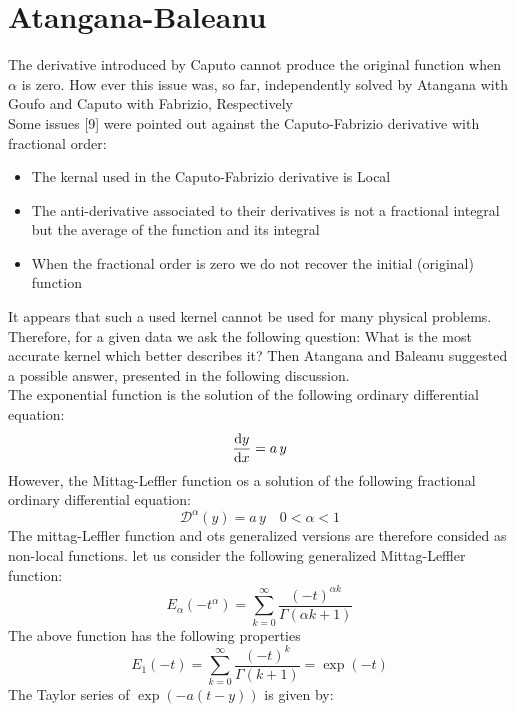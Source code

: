 \documentclass[twoside]{book}
\begin{document}
{\section{Atangana-Baleanu}
The derivative introduced by Caputo cannot produce the original function when $\alpha$ is zero. How ever this issue was, so far, independently solved by Atangana with Goufo and Caputo with Fabrizio, Respectively\\
Some issues [9] were pointed out against the Caputo-Fabrizio derivative with fractional order:
\begin{itemize}
    \item The kernal used in the Caputo-Fabrizio derivative is Local
    \item The anti-derivative associated to their derivatives is not a fractional integral but the average of the function and its integral
    \item When the fractional order is zero we do not recover the initial (original) function
\end{itemize}
It appears that such a used kernel cannot be used for many physical problems. Therefore, for
a given data we ask the following question: What is the most accurate kernel which better
describes it? Then Atangana and Baleanu suggested a possible answer, presented in the following discussion.\\
\newline
The exponential function is the solution of the following ordinary differential equation:
\begin{equation}
    \dv{y}{x} = a\, y
\end{equation}
However, the Mittag-Leffler function os a solution of the following fractional ordinary differential equation:
\begin{equation}
    \mathcal{D}^{\alpha} (y) = a \, y \quad 0<\alpha<1
\end{equation}
The mittag-Leffler function and ots generalized versions are therefore consided as non-local functions. let us consider the following generalized Mittag-Leffler function:
\begin{equation}
    E_{\alpha}(-t^\alpha) = \sum_{k=0}^{\infty} \frac{(-t)^{\alpha k}}{\Gamma{( \alpha k +1)}}
\end{equation}
The above function has the following properties
\begin{equation}
    E_{1}(-t) = \sum_{k=0}^{\infty} \frac{(-t)^{ k}}{\Gamma{ (k +1)}} = \exp(-t)
\end{equation}
The Taylor series of $\exp(-a(t-y))$ is given by:
}
\end{document}
